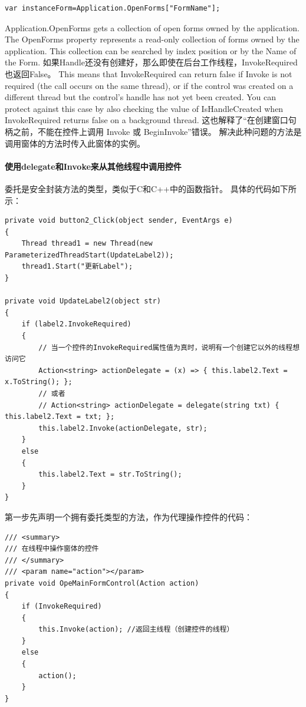\documentclass{book}
\begin{document}
\begin{lstlisting}[language={[Sharp]C}]
var instanceForm=Application.OpenForms["FormName"];
\end{lstlisting}

Application.OpenForms gets a collection of open forms owned by the application.
The OpenForms property represents a read-only collection of forms owned by the application. 
This collection can be searched by index position or by the Name of the Form.
如果Handle还没有创建好，那么即使在后台工作线程，InvokeRequired也返回False。
This means that InvokeRequired can return false if Invoke is not required (the call occurs on the same thread), 
or if the control was created on a different thread but the control’s handle has not yet been created.
You can protect against this case by also checking the value of IsHandleCreated when InvokeRequired returns false on a background thread.
这也解释了“在创建窗口句柄之前，不能在控件上调用 Invoke 或 BeginInvoke”错误。
解决此种问题的方法是调用窗体的方法时传入此窗体的实例。


\paragraph{使用delegate和Invoke来从其他线程中调用控件}委托是安全封装方法的类型，类似于C和C++中的函数指针。
具体的代码如下所示：

\begin{lstlisting}[language={[Sharp]C}]
private void button2_Click(object sender, EventArgs e)
{
	Thread thread1 = new Thread(new ParameterizedThreadStart(UpdateLabel2));
	thread1.Start("更新Label");
}
	
private void UpdateLabel2(object str)
{
	if (label2.InvokeRequired)
	{
		// 当一个控件的InvokeRequired属性值为真时，说明有一个创建它以外的线程想访问它
		Action<string> actionDelegate = (x) => { this.label2.Text = x.ToString(); };
		// 或者
		// Action<string> actionDelegate = delegate(string txt) { this.label2.Text = txt; };
		this.label2.Invoke(actionDelegate, str);
	}
	else
	{
		this.label2.Text = str.ToString();
	}
}
\end{lstlisting}

第一步先声明一个拥有委托类型的方法，作为代理操作控件的代码：

\begin{lstlisting}[language={[Sharp]C}]
/// <summary>
/// 在线程中操作窗体的控件
/// </summary>
/// <param name="action"></param>
private void OpeMainFormControl(Action action)
{
	if (InvokeRequired)
	{
		this.Invoke(action); //返回主线程（创建控件的线程）
	}
	else
	{
		action();
	}
}
\end{lstlisting}
\end{document}
